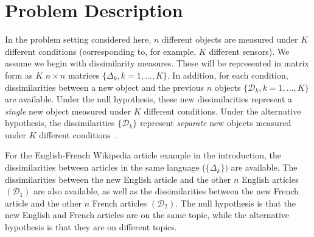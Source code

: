 \documentclass[12pt]{article} %
\begin{document}

\section{Problem Description}
In the problem setting considered here,  $n$ different objects are measured under $K$ different conditions (corresponding  to, for example, $K$ different sensors). We assume we begin with dissimilarity measures. These will be represented in matrix form as $K$ $n \times n$ matrices $\{\Delta_k,k=1 ,\ldots,K\}$.  In addition, for each condition, dissimilarities between  a new object  and the previous 
$n$ objects $\{\mathcal{D}_k,k=1 ,\ldots,K\}$ are available. Under  the null hypothesis, these new dissimilarities represent a \emph{single} new object   measured under $K$ different conditions. Under the alternative hypothesis, the dissimilarities $\{\mathcal{D}_k\}$ represent \emph{separate} new objects   measured under $K$ different conditions~\cite{JOFC}. %

For the English-French Wikipedia  article example in the introduction,  the dissimilarities between articles in the same language  ($\{\Delta_k\})$ are available. The dissimilarities between the new English article and the  other $n$ English articles $(\mathcal{D}_1)$ are also available, as well as the dissimilarities between the new French article  and the other $n$ French articles $(\mathcal{D}_2)$. The null hypothesis is that the new English and French articles are on the same topic, while the alternative hypothesis is that they are on different topics.
\end{document}
